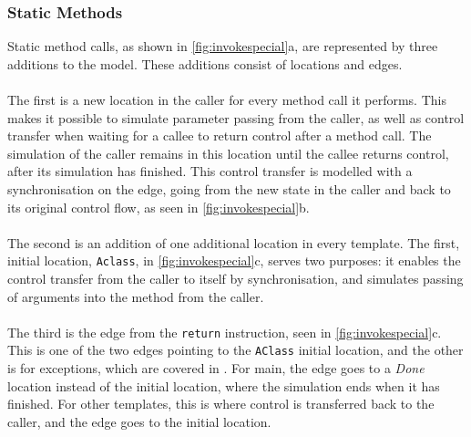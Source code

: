 \subsubsection{Static Methods}
Static method calls, as shown in \cref{fig:invokespecial}a, are represented by three additions to the model. These additions consist of locations and edges.\\\\ 
The first is a new location in the caller for every method call it performs. This makes it possible to simulate parameter passing from the caller, as well as control transfer when waiting for a callee to return control after a method call. The simulation of the caller remains in this location until the callee returns control, after its simulation has finished. This control transfer is modelled with a synchronisation on the edge, going from the new state in the caller and back to its original control flow, as seen in \cref{fig:invokespecial}b.\\\\
The second is an addition of one additional location in every template. The first, initial location, \texttt{Aclass}, in \cref{fig:invokespecial}c, serves two purposes: it enables the control transfer from the caller to itself by synchronisation, and simulates passing of arguments into the method from the caller.\\\\
The third is the edge from the \texttt{return} instruction, seen in \cref{fig:invokespecial}c. This is one of the two edges pointing to the \texttt{AClass} initial location, and the other is for exceptions, which are covered in . For main, the edge goes to a \textit{Done} location instead of the initial location, where the simulation ends when it has finished. For other templates, this is where control is transferred back to the caller, and the edge goes to the initial location.


